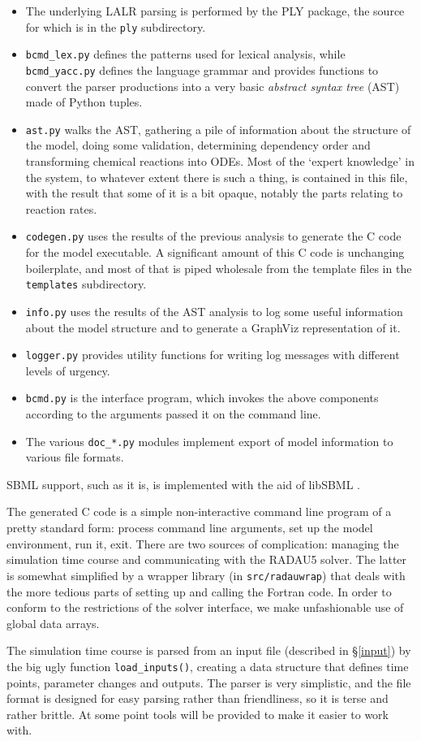 \documentclass[a4paper,11pt]{article}
\begin{document}
\begin{itemize}
\item The underlying LALR parsing is performed by the PLY package, the source for which is in the \texttt{ply} subdirectory.
\item \texttt{bcmd\_lex.py} defines the patterns used for lexical analysis, while \texttt{bcmd\_yacc.py} defines the language grammar and provides functions to convert the parser productions into a very basic \textit{abstract syntax tree} (AST) made of Python tuples.
\item \texttt{ast.py} walks the AST, gathering a pile of information about the structure of the model, doing some validation, determining dependency order and transforming chemical reactions into ODEs. Most of the `expert knowledge' in the system, to whatever extent there is such a thing, is contained in this file, with the result that some of it is a bit opaque, notably the parts relating to reaction rates.
\item \texttt{codegen.py} uses the results of the previous analysis to generate the C code for the model executable. A significant amount of this C code is unchanging boilerplate, and most of that is piped wholesale from the template files in the \texttt{templates} subdirectory.
\item \texttt{info.py} uses the results of the AST analysis to log some useful information about the model structure and to generate a GraphViz representation of it.
\item \texttt{logger.py} provides utility functions for writing log messages with different levels of urgency.
\item \texttt{bcmd.py} is the interface program, which invokes the above components according to the arguments passed it on the command line.
\item The various \texttt{doc\_*.py} modules implement export of model information to various file formats.
\end{itemize}

SBML support, such as it is, is implemented with the aid of libSBML \citep{Bornstein:2008id}.

The generated C code is a simple non-interactive command line program of a pretty standard form: process command line arguments, set up the model environment, run it, exit. There are two sources of complication: managing the simulation time course and communicating with the RADAU5 solver. The latter is somewhat simplified by a wrapper library (in \texttt{src/radauwrap}) that deals with the more tedious parts of setting up and calling the Fortran code. In order to conform to the restrictions of the solver interface, we make unfashionable use of global data arrays.

The simulation time course is parsed from an input file (described in \S\ref{input}) by the big ugly function \texttt{load\_inputs()}, creating a data structure that defines time points, parameter changes and outputs. The parser is very simplistic, and the file format is designed for easy parsing rather than friendliness, so it is terse and rather brittle. At some point tools will be provided to make it easier to work with.




\end{document}
